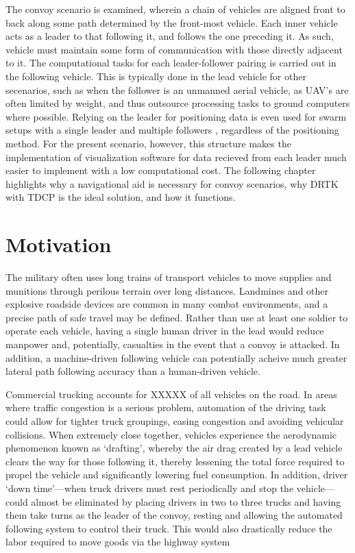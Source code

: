 \documentclass[12pt]{report}
\begin{document}
The convoy scenario is examined, wherein a chain of vehicles are aligned front to back along some path determined by the front-most vehicle. Each inner vehicle acts as a leader to that following it, and follows the one preceding it. As such, vehicle must maintain some form of communication with those directly adjacent to it.
The computational tasks for each leader-follower pairing is carried out in the following vehicle. This is typically done in the lead vehicle for other secenarios, such as when the follower is an unmanned aerial vehicle, as UAV's are often limited by weight, and thus outsource processing tasks to ground computers where possible. Relying on the leader for positioning data is even used for swarm setups with a single leader and multiple followers \cite{gian}, regardless of the positioning method. For the present scenario, however, this structure makes the implementation of visualization software for data recieved from each leader much easier to implement with a low computational cost. The following chapter highlights why a navigational aid is necessary for convoy scenarios, why DRTK with TDCP is the ideal solution, and how it functions.

\section{Motivation} %
The military often uses long trains of transport vehicles to move supplies and munitions through perilous terrain over long distances. Landmines and other explosive roadside devices are common in many combat environments, and a precise path of safe travel may be defined. Rather than use at least one soldier to operate each vehicle, having a single human driver in the lead would reduce manpower and, potentially, casualties in the event that a convoy is attacked. In addition, a machine-driven following vehicle can potentially acheive much greater lateral path following accuracy than a human-driven vehicle.

Commercial trucking accounts for XXXXX of all vehicles on the road. In areas where traffic congestion is a serious problem, automation of the driving task could allow for tighter truck groupings, easing congestion and avoiding vehicular collisions. When extremely close together, vehicles experience the aerodynamic phenomenon known as `drafting', whereby the air drag created by a lead vehicle clears the way for those following it, thereby lessening the total force required to propel the vehicle and significantly lowering fuel consumption. In addition, driver `down time'---when truck drivers must rest periodically and stop the vehicle---could almost be eliminated by placing drivers in two to three trucks and having them take turns as the leader of the convoy, resting and allowing the automated following system to control their truck. This would also drastically reduce the labor required to move goods via the highway system
\end{document}
